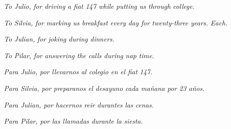\cleardoublepage

\begin{dedication}
\emph{To Julio, for driving a fiat 147 while putting us through college.}

\emph{To Silvia, for marking us breakfast every day for twenty-three years. Each.} 

\emph{To Julian, for joking during dinners.}

 \emph{To Pilar, for answering the calls during nap time.\\}
 


\emph{Para Julio, por llevarnos al colegio en el fiat 147.}

\emph{Para Silvia, por preparanos el desayuno cada ma\~nana por 23 a\~nos.}

\emph{Para Julian, por hacernos reir durantes las cenas.}

\emph{Para Pilar, por las llamadas durante la siesta. }
\end{dedication}


